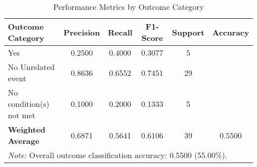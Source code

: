 \begin{table}[!ht]
\centering
\caption{Performance Metrics by Outcome Category}
\label{tab:classification_metrics}
\begin{tabular}{lccccc}
\toprule
\textbf{Outcome Category} & \textbf{Precision} & \textbf{Recall} & \textbf{F1-Score} & \textbf{Support} & \textbf{Accuracy} \\
\midrule
Yes & 0.2500 & 0.4000 & 0.3077 & 5 & \multirow{1}{*}{} \\
No \- Unrelated event & 0.8636 & 0.6552 & 0.7451 & 29 & \multirow{1}{*}{} \\
No \- condition(s) not met & 0.1000 & 0.2000 & 0.1333 & 5 & \multirow{1}{*}{} \\
\midrule
\textbf{Weighted Average} & 0.6871 & 0.5641 & 0.6106 & 39 & 0.5500 \\
\bottomrule
\multicolumn{6}{p{14cm}}{\textit{Note:} Overall outcome classification accuracy: 0.5500 (55.00\%).} \\
\end{tabular}
\end{table}
